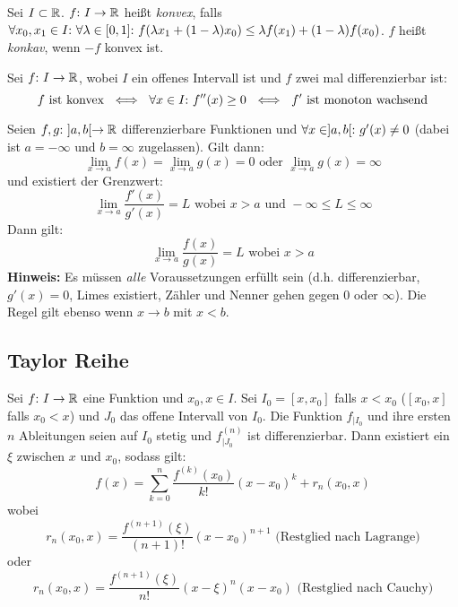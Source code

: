 \begin{frameddefn}
	Sei $I \subset \mathbb{R}$. $f{:}\  I \to \mathbb{R}$ heißt \textit{konvex}, falls $\forall x_0, x_1 \in I{:}\  \forall \lambda \in [0,1]{:}\  f(\lambda x_1 + (1-\lambda) x_0) \leq \lambda f(x_1) + (1-\lambda) f(x_0)$. $f$ heißt \textit{konkav}, wenn $-f$ konvex ist.
\end{frameddefn}

\begin{framedthm}
	Sei $f{:}\  I \to \mathbb{R}$, wobei $I$ ein offenes Intervall ist und $f$ zwei mal differenzierbar ist:
	\[
	f \textrm{ ist konvex } \iff\  \forall x \in I{:}\  f''(x) \geq 0 \ \iff\ f' \textrm{ ist monoton wachsend}
	\]
\end{framedthm}

\begin{framedthm}
	Seien $f,g {:}\  ]a,b[ \to \mathbb{R}$ differenzierbare Funktionen und $\forall x \in ]a,b[{:}\  g'(x) \neq 0$ (dabei ist $a=-\infty$ und $b=\infty$ zugelassen). Gilt dann:
	\[
	\lim\limits_{x \to a} f(x) = \lim\limits_{x \to a} g(x) = 0 \textrm{ oder } \lim\limits_{x \to a} g(x) = \infty
	\]
	und existiert der Grenzwert:
	\[
	\lim\limits_{x \to a} \frac{f'(x)}{g'(x)} = L \textrm{ wobei } x > a \textrm{ und } -\infty\leq L \leq \infty
	\]
	Dann gilt:
	\[
	\lim\limits_{x \to a} \frac{f(x)}{g(x)} = L \textrm{ wobei } x > a
	\]
	\textbf{Hinweis:} Es müssen \textit{alle} Voraussetzungen erfüllt sein (d.h. differenzierbar, $g'(x) = 0$, Limes existiert, Zähler und Nenner gehen gegen $0$ oder $\infty$). Die Regel gilt ebenso wenn $x \to b$ mit $x < b$.
\end{framedthm}

\newpage
\subsection{Taylor Reihe}

\begin{framedthm}
	Sei $f{:}\  I \to \mathbb{R}$ eine Funktion und $x_0, x \in I$. Sei $I_0 = [x, x_0]$ falls $x < x_0$ ($[x_0, x]$ falls $x_0 < x$) und $J_0$ das offene Intervall von $I_0$. Die Funktion $f_{|I_{0}}$ und ihre ersten $n$ Ableitungen seien auf $I_0$ stetig und $f^{(n)}_{|J_{0}}$ ist differenzierbar. Dann existiert ein $\xi$ zwischen $x$ und $x_0$, sodass gilt:
	\[
	f(x) = \sum^{n}_{k=0} \frac{f^{(k)}(x_0)}{k!} (x-x_0)^k + r_n(x_0, x)
	\]
	wobei
	\[
	r_n(x_0,x) = \frac{f^{(n+1)}(\xi)}{(n+1)!} (x-x_0)^{n+1} \textrm{ (Restglied nach Lagrange)}
	\]
	oder
	\[
	r_n(x_0,x) = \frac{f^{(n+1)}(\xi)}{n!} (x-\xi)^{n} (x-x_0) \textrm{ (Restglied nach Cauchy)}
	\]
\end{framedthm}

